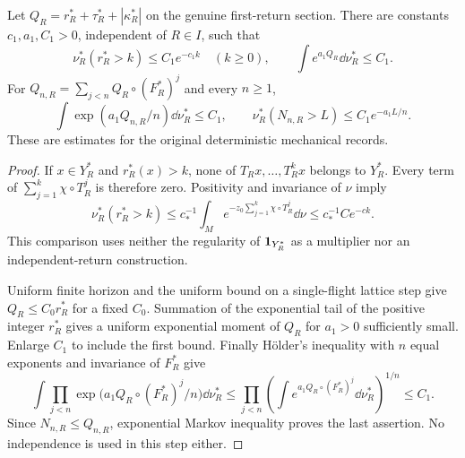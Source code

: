 \begin{theorem}
\label{thm:exponential-return}
Let
$Q_R=r_R^*+\tau_R^*+|\kappa_R^*|$ on the genuine first-return section.
There are constants $c_1,a_1,C_1>0$, independent of $R\in I$, such that
\begin{equation}\label{eq:exponential-return}
 \nu_R^*(r_R^*>k)\le C_1e^{-c_1k}\quad(k\ge0),\qquad
 \int e^{a_1 Q_R}\dd\nu_R^*\le C_1.
\end{equation}
For $Q_{n,R}=\sum_{j<n}Q_R\circ(F_R^*)^j$ and every $n\ge1$,
\begin{equation}\label{eq:block-exponential-moment}
 \int\exp(a_1 Q_{n,R}/n)\dd\nu_R^*\le C_1,\qquad
 \nu_R^*(N_{n,R}>L)\le C_1e^{-a_1L/n}.
\end{equation}
These are estimates for the original deterministic mechanical records.
\end{theorem}
\begin{proof}
If $x\in Y_R^*$ and $r_R^*(x)>k$, none of $T_Rx,\ldots,T_R^kx$
belongs to $Y_R^*$. Every term of $\sum_{j=1}^k\chi\circ T_R^j$ is
therefore zero. Positivity and invariance of $\nu$ imply
\[
 \nu_R^*(r_R^*>k)
 \le c_*^{-1}\int_M e^{-z_0\sum_{j=1}^k\chi\circ T_R^j}\dd\nu
 \le c_*^{-1}Ce^{-ck}.
\]
This comparison uses neither the regularity of $\mathbf1_{Y_R^*}$ as a
multiplier nor an independent-return construction.

Uniform finite horizon and the uniform bound on a single-flight lattice
step give $Q_R\le C_0 r_R^*$ for a fixed $C_0$. Summation of the
exponential tail of the positive integer $r_R^*$ gives a uniform
exponential moment of $Q_R$ for $a_1>0$ sufficiently small. Enlarge
$C_1$ to include the first bound. Finally H\"older's inequality with
$n$ equal exponents and invariance of $F_R^*$ give
\[
 \int\prod_{j<n}\exp\bigl(a_1Q_R\circ(F_R^*)^j/n\bigr)\dd\nu_R^*
 \le\prod_{j<n}\left(\int e^{a_1Q_R\circ(F_R^*)^j}\dd\nu_R^*\right)^{1/n}
 \le C_1.
\]
Since $N_{n,R}\le Q_{n,R}$, exponential Markov inequality proves the
last assertion. No independence is used in this step either.
\end{proof}


